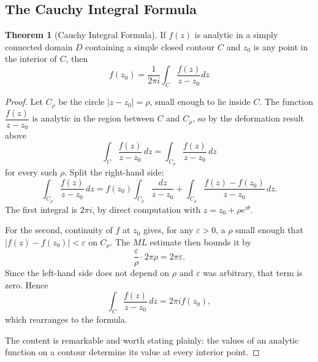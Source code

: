 \documentclass[11pt,a4paper]{article}
\theoremstyle{definition}
\newtheorem{thm}{Theorem}[section]
\begin{document}
{\color[wave]{485}\subsection{The Cauchy Integral Formula}}

\begin{thm}[Cauchy Integral Formula]
If $f(z)$ is analytic in a simply connected domain $D$ containing a simple closed contour $C$ and $z_0$ is any point in the interior of $C$, then $$ f(z_0) = \frac{1}{2\pi i} \int_C \frac{f(z)}{z - z_0}dz$$
\end{thm}

\begin{proof}
Let $C_\rho$ be the circle $\left|z-z_0\right|=\rho$, small enough to lie inside
$C$. The function $\dfrac{f(z)}{z-z_0}$ is analytic in the region between $C$
and $C_\rho$, so by the deformation result above
$$\int_C\frac{f(z)}{z-z_0}\,dz=\int_{C_\rho}\frac{f(z)}{z-z_0}\,dz$$
for every such $\rho$. Split the right-hand side:
$$\int_{C_\rho}\frac{f(z)}{z-z_0}\,dz
=f(z_0)\int_{C_\rho}\frac{dz}{z-z_0}
+\int_{C_\rho}\frac{f(z)-f(z_0)}{z-z_0}\,dz .$$
The first integral is $2\pi i$, by direct computation with
$z=z_0+\rho e^{i\theta}$.

For the second, continuity of $f$ at $z_0$ gives, for any $\varepsilon>0$, a
$\rho$ small enough that $\left|f(z)-f(z_0)\right|<\varepsilon$ on $C_\rho$.
The $ML$ estimate then bounds it by
$$\frac{\varepsilon}{\rho}\cdot 2\pi\rho=2\pi\varepsilon .$$
Since the left-hand side does not depend on $\rho$ and $\varepsilon$ was
arbitrary, that term is zero. Hence
$$\int_C\frac{f(z)}{z-z_0}\,dz=2\pi i f(z_0),$$
which rearranges to the formula.

The content is remarkable and worth stating plainly: the values of an analytic
function on a contour determine its value at every interior point.
\end{proof}
\end{document}

